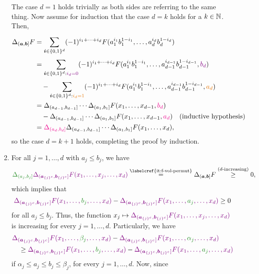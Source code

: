 \begin{enumerate}
\begin{pf}
\begin{enumerate}
The case \(d=1\) holds trivially as both sides are referring to the same
thing. Now assume for induction that the case \(d=k\) holds for a \(k\in\mathbb{N}\).
Then,
\begin{align*}
\Delta_{(\vect{a},\vect{b}]}F&=
\sum_{\vect{i}\in\{0,1\}^{d}}^{}(-1)^{i_{1}+\dotsb+i_{d}}
F(a_1^{i_1}b_1^{1-i_1},\dotsc,a_{d}^{i_d}b_{d}^{1-i_{d}}) \\
&=
\sum_{\vect{i}\in\{0,1\}^{d}: \vc{i_d=0}}^{}(-1)^{i_{1}+\dotsb+i_{d}}
F(a_1^{i_1}b_1^{1-i_1},\dotsc,a_{d-1}^{i_{d-1}}b_{d-1}^{1-i_{d-1}},\vc{b_d}) \\
&\quad-\sum_{\vect{i}\in\{0,1\}^{d}: \orc{i_d=1}}^{}(-1)^{i_{1}+\dotsb+i_{d}}
F(a_1^{i_1}b_1^{1-i_1},\dotsc,a_{d-1}^{i_{d-1}}b_{d-1}^{1-i_{d-1}},\orc{a_d}) \\
&=
\Delta_{(a_{d-1},b_{d-1}]}\dotsb\Delta_{(a_1,b_1]}F(x_1,\dotsc,x_{d-1},\mgc{b_d}) \\
&\quad-\Delta_{(a_{d-1},b_{d-1}]}\dotsb\Delta_{(a_1,b_1]}F(x_1,\dotsc,x_{d-1},\mgc{a_d})
\quad\text{(inductive hypothesis)} \\
&=\mgc{\Delta_{(a_d,b_d]}}\Delta_{(a_{d-1},b_{d-1}]}\dotsb\Delta_{(a_1,b_1]}F(x_1,\dotsc,x_d),
\end{align*}
so the case \(d=k+1\) holds, completing the proof by induction.
\item For all \(j=1,\dotsc,d\) with \(a_j\le b_j\), we have
\[\gc{\Delta_{(a_j,b_j]}}
\vc{\Delta_{(\vect{a}_{\{j\}^{c}},\vect{b}_{\{j\}^{c}}]}F(x_1,\dotsc,x_j,\dotsc,x_d)}
\overset{\text{\labelcref{it:f-vol-permut}}}{=}
\Delta_{(\vect{a},\vect{b}]}F\overset{\text{(\(d\)-increasing)}}{\ge}0,
\]
which implies that
\[
\vc{\Delta_{(\vect{a}_{\{j\}^{c}},\vect{b}_{\{j\}^{c}}]}F(x_1,\dotsc,\gc{b_j},\dotsc,x_d)}
-\vc{\Delta_{(\vect{a}_{\{j\}^{c}},\vect{b}_{\{j\}^{c}}]}F(x_1,\dotsc,\gc{a_j},\dotsc,x_d)}
\ge 0
\]
for all \(a_j\le b_j\). Thus, the function
\(x_j\mapsto\vc{\Delta_{(\vect{a}_{\{j\}^{c}},\vect{b}_{\{j\}^{c}}]}F(x_1,\dotsc,x_j,\dotsc,x_d)}\) is
increasing for every \(j=1,\dotsc,d\). Particularly, we have
\begin{align*}
&\vc{\Delta_{(\vect{a}_{\{j\}^{c}},\vect{b}_{\{j\}^{c}}]}F(x_1,\dotsc,\gc{\beta_j},\dotsc,x_d)}
-\vc{\Delta_{(\vect{a}_{\{j\}^{c}},\vect{b}_{\{j\}^{c}}]}F(x_1,\dotsc,\gc{\alpha_j},\dotsc,x_d)} \\
&\quad\ge
\vc{\Delta_{(\vect{a}_{\{j\}^{c}},\vect{b}_{\{j\}^{c}}]}F(x_1,\dotsc,\gc{b_j},\dotsc,x_d)}
-\vc{\Delta_{(\vect{a}_{\{j\}^{c}},\vect{b}_{\{j\}^{c}}]}F(x_1,\dotsc,\gc{a_j},\dotsc,x_d)}
\end{align*}
if \(\alpha_j\le a_j\le b_j\le\beta_j\), for every \(j=1,\dotsc,d\). Now, since

\end{enumerate}
\end{pf}
\end{enumerate}
